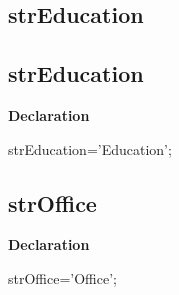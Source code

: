 \documentclass{report}
\newif\ifpdf
\begin{document}
\subsection*{\large{\textbf{strEducation}}\normalsize\hspace{1ex}\hrulefill}
\else
\subsection*{strEducation}
\fi
\label{trstrings-strEducation}
\begin{list}{}{
\setlength{\itemindent}{0cm}
\setlength{\listparindent}{0cm}
\setlength{\leftmargin}{\evensidemargin}
\addtolength{\leftmargin}{\tmplength}
\settowidth{\labelsep}{X}
\addtolength{\leftmargin}{\labelsep}
\setlength{\labelwidth}{\tmplength}
}
\item[\textbf{Declaration}\hfill]
\ifpdf
\begin{flushleft}
\fi
\begin{ttfamily}
strEducation='Education';\end{ttfamily}

\ifpdf
\end{flushleft}
\fi

\end{list}
\ifpdf
\subsection*{\large{\textbf{strOffice}}\normalsize\hspace{1ex}\hrulefill}
\else
\subsection*{strOffice}
\fi
\label{trstrings-strOffice}
\begin{list}{}{
\setlength{\itemindent}{0cm}
\setlength{\listparindent}{0cm}
\setlength{\leftmargin}{\evensidemargin}
\addtolength{\leftmargin}{\tmplength}
\settowidth{\labelsep}{X}
\addtolength{\leftmargin}{\labelsep}
\setlength{\labelwidth}{\tmplength}
}
\item[\textbf{Declaration}\hfill]
\ifpdf
\begin{flushleft}
\fi
\begin{ttfamily}
strOffice='Office';\end{ttfamily}

\ifpdf
\end{flushleft}
\fi

\end{list}
\ifpdf
\end{document}
